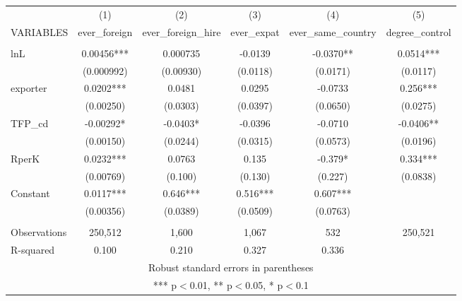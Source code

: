 \documentclass[]{article}
\begin{document}
\begin{tabular}{lccccc} \hline
 & (1) & (2) & (3) & (4) & (5) \\
VARIABLES & ever\_foreign & ever\_foreign\_hire & ever\_expat & ever\_same\_country & degree\_control \\ \hline
 &  &  &  &  &  \\
lnL & 0.00456*** & 0.000735 & -0.0139 & -0.0370** & 0.0514*** \\
 & (0.000992) & (0.00930) & (0.0118) & (0.0171) & (0.0117) \\
exporter & 0.0202*** & 0.0481 & 0.0295 & -0.0733 & 0.256*** \\
 & (0.00250) & (0.0303) & (0.0397) & (0.0650) & (0.0275) \\
TFP\_cd & -0.00292* & -0.0403* & -0.0396 & -0.0710 & -0.0406** \\
 & (0.00150) & (0.0244) & (0.0315) & (0.0573) & (0.0196) \\
RperK & 0.0232*** & 0.0763 & 0.135 & -0.379* & 0.334*** \\
 & (0.00769) & (0.100) & (0.130) & (0.227) & (0.0838) \\
Constant & 0.0117*** & 0.646*** & 0.516*** & 0.607*** &  \\
 & (0.00356) & (0.0389) & (0.0509) & (0.0763) &  \\
 &  &  &  &  &  \\
Observations & 250,512 & 1,600 & 1,067 & 532 & 250,521 \\
 R-squared & 0.100 & 0.210 & 0.327 & 0.336 &  \\ \hline
\multicolumn{6}{c}{ Robust standard errors in parentheses} \\
\multicolumn{6}{c}{ *** p$<$0.01, ** p$<$0.05, * p$<$0.1} \\
\end{tabular}
\end{document}
